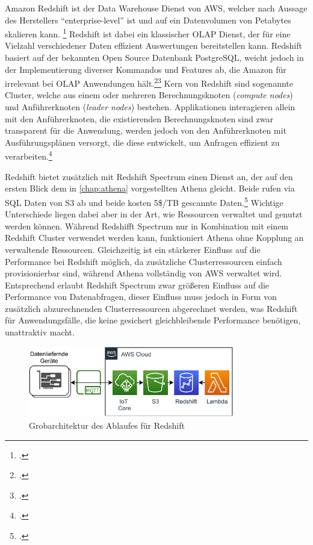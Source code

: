 Amazon Redshift ist der Data Warehouse Dienst von \ac{AWS}, welcher nach Aussage des Herstellers \enquote{enterprise-level} ist und auf ein Datenvolumen von Petabytes skalieren kann. \footcite[Vgl.][1]{AmazonWebServicesInc..o.J.g} Redshift ist dabei ein klassischer \ac{OLAP} Dienst, der für eine Vielzahl verschiedener Daten effizient Auswertungen bereitstellen kann. Redshift basiert auf der bekannten Open Source Datenbank PostgreSQL, weicht jedoch in der Implementierung diverser Kommandos und Features ab, die Amazon für irrelevant bei \ac{OLAP} Anwendungen hält.\footcite[Vgl.][4]{AmazonWebServicesInc..o.J.g}\nzitat\footcite[Vgl.][428\psqq]{AmazonWebServicesInc..o.J.g} Kern von Redshift sind sogenannte Cluster, welche aus einem oder mehreren Berechnungsknoten (\textit{compute nodes}) und Anführerknoten (\textit{leader nodes}) bestehen. Applikationen interagieren allein mit den Anführerknoten, die existierenden Berechnungsknoten sind zwar transparent für die Anwendung, werden jedoch von den Anführerknoten mit Ausführungsplänen versorgt, die diese entwickelt, um Anfragen effizient zu verarbeiten.\footcite[Vgl.][4]{AmazonWebServicesInc..o.J.g}

Redshift bietet zusätzlich mit Redshift Spectrum einen Dienst an, der auf den ersten Blick dem in \autoref{chap:athena} vorgestellten Athena gleicht. Beide rufen via \ac{SQL} Daten von \ac{S3} ab und beide kosten 5\$/TB gescannte Daten.\footcite[Vgl. auch im Folgenden][]{Smallcombe.2020} Wichtige Unterschiede liegen dabei aber in der Art, wie Ressourcen verwaltet und genutzt werden können. Während Redshifft Spectrum nur in Kombination mit einem Redshift Cluster verwendet werden kann, funktioniert Athena ohne Kopplung an verwaltende Ressourcen. Gleichzeitig ist ein stärkerer Einfluss auf die Performance bei Redshift möglich, da zusätzliche Clusterressourcen einfach provisionierbar sind, während Athena vollständig von \ac{AWS} verwaltet wird. Entsprechend erlaubt Redshift Spectrum zwar größeren Einfluss auf die Performance von Datenabfragen, dieser Einfluss muss jedoch in Form von zusätzlich abzurechnenden Clusterressourcen abgerechnet werden, was Redshift für Anwendungsfälle, die keine gesichert gleichbleibende Performance benötigen, unattraktiv macht.

\begin{figure}[H]
\centering
\includegraphics[width=0.8\textwidth]{graphics/Redshift-general.pdf}
\caption{Grobarchitektur des Ablaufes für Redshift}
\label{abb:GrobArchitekturRedshift}
\end{figure}

